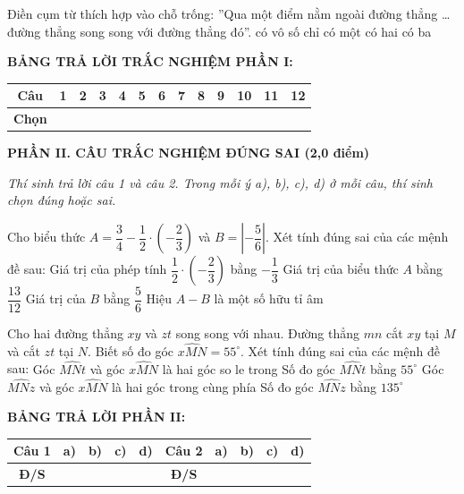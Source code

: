 \documentclass[12pt,a4paper]{article}
\begin{document}
\begin{ex}
Điền cụm từ thích hợp vào chỗ trống: ''Qua một điểm nằm ngoài đường thẳng \dots đường thẳng song song với đường thẳng đó''.
\choice
{có vô số}
{\True chỉ có một}
{có hai}
{có ba}
\end{ex}


\vspace{1mm}
\noindent\textbf{BẢNG TRẢ LỜI TRẮC NGHIỆM PHẦN I:}
\begin{center}
\begin{tabular}{|c|c|c|c|c|c|c|c|c|c|c|c|c|}
\hline
\textbf{Câu} & \textbf{1} & \textbf{2} & \textbf{3} & \textbf{4} & \textbf{5} & \textbf{6} & \textbf{7} & \textbf{8} & \textbf{9} & \textbf{10} & \textbf{11} & \textbf{12} \\
\hline
\textbf{Chọn} & \rule{0pt}{0.65cm} & & & & & & & & & & & \\
\hline
\end{tabular}
\end{center}
\vspace{2mm}

\setcounter{ex}{0}
\noindent\textbf{\large PHẦN II. CÂU TRẮC NGHIỆM ĐÚNG SAI (2,0 điểm)}

\textit{Thí sinh trả lời câu 1 và câu 2. Trong mỗi ý a), b), c), d) ở mỗi câu, thí sinh chọn đúng hoặc sai.}

\vspace{1mm}
\begin{ex}
Cho biểu thức $A = \dfrac{3}{4} - \dfrac{1}{2} \cdot \left(-\dfrac{2}{3}\right)$ và $B = \left|-\dfrac{5}{6}\right|$. Xét tính đúng sai của các mệnh đề sau:
\choiceTF
{\True Giá trị của phép tính $\dfrac{1}{2} \cdot \left(-\dfrac{2}{3}\right)$ bằng $-\dfrac{1}{3}$}
{\True Giá trị của biểu thức $A$ bằng $\dfrac{13}{12}$}
{\True Giá trị của $B$ bằng $\dfrac{5}{6}$}
{Hiệu $A - B$ là một số hữu tỉ âm}
\end{ex}

\begin{ex}
Cho hai đường thẳng $xy$ và $zt$ song song với nhau. Đường thẳng $mn$ cắt $xy$ tại $M$ và cắt $zt$ tại $N$. Biết số đo góc $\widehat{xMN} = 55^\circ$. Xét tính đúng sai của các mệnh đề sau:
\choiceTF
{\True Góc $\widehat{MNt}$ và góc $\widehat{xMN}$ là hai góc so le trong}
{\True Số đo góc $\widehat{MNt}$ bằng $55^\circ$}
{\True Góc $\widehat{MNz}$ và góc $\widehat{xMN}$ là hai góc trong cùng phía}
{Số đo góc $\widehat{MNz}$ bằng $135^\circ$}
\end{ex}


\noindent\textbf{BẢNG TRẢ LỜI PHẦN II:}
\begin{center}
\begin{tabular}{|c|c|c|c|c||c|c|c|c|c|}
\hline
\textbf{Câu 1} & \textbf{a)} & \textbf{b)} & \textbf{c)} & \textbf{d)} & \textbf{Câu 2} & \textbf{a)} & \textbf{b)} & \textbf{c)} & \textbf{d)} \\
\hline
\textbf{Đ/S} & \rule{0pt}{0.6cm} & & & & \textbf{Đ/S} & & & & \\
\hline
\end{tabular}
\end{center}
\vspace{2mm}
\end{document}

